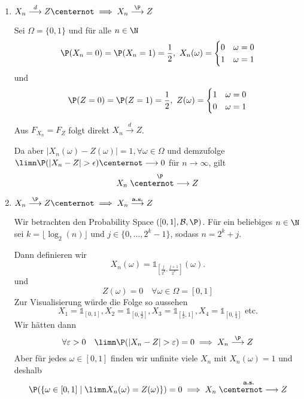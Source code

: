 \begin{enumerate}
    \item $X_n \overset{d}{\longrightarrow} Z \centernot\implies X_n \overset{\P}{\longrightarrow} Z$
    
    Sei $\Omega = \{0, 1\}$ und für alle $n \in \N$
    $$\P(X_n = 0) = \P(X_n = 1) = \frac{1}{2}, \ X_n(\omega) = \begin{cases}
        0 & \omega = 0\\
        1 & \omega = 1
    \end{cases} 
    $$
    und $$\P(Z = 0) = \P(Z = 1) = \frac{1}{2}, \ Z(\omega) = \begin{cases}
        1 & \omega = 0\\
        0 & \omega = 1
    \end{cases} $$

    Aus $F_{X_n} = F_Z$ folgt direkt $X_n \overset{d}{\longrightarrow} Z$.
    
    Da aber $|X_n(\omega) - Z(\omega)| = 1, \forall \omega \in \Omega$ und demzufolge\\ 
    $\limn \P(|X_n - Z| > \epsilon) \centernot\longrightarrow 0$ für $n \to \infty$, gilt  
    $$X_n \overset{\P}{\centernot\longrightarrow} Z$$
    \item $X_n \overset{\P}{\longrightarrow} Z \centernot\implies X_n \overset{\textbf{a.s.}}{\longrightarrow} Z$
    
    Wir betrachten den Probability Space $([0,1], \mathcal{B}, \P)$.
    Für ein beliebiges $n \in \N$ sei $k = \lfloor\log_2(n)\rfloor$ und $j \in \{0, \ldots, 2^k-1\}$, sodass $n = 2^k + j$.
    
    Dann definieren wir 
    $$X_n(\omega) = \mathds{1}_{\left[\frac{j}{2^k}, \frac{j+1}{2^k}\right]}(\omega).$$
    und
    $$Z(\omega) = 0 \quad \forall \omega \in \Omega = [0,1]$$
    Zur Visualisierung würde die Folge so aussehen
    $$X_1 = \mathds{1}_{[0,1]}, X_2 = \mathds{1}_{\left[0,\frac{1}{2}\right]}, X_3 = \mathds{1}_{\left[\frac{1}{2}, 1\right]}, X_4 = \mathds{1}_{\left[0,\frac{1}{4}\right]} \text{ etc.}$$
    Wir hätten dann
    $$\forall \varepsilon > 0 \quad \limn \P(|X_n - Z| > \varepsilon) = 0 \implies X_n \overset{\P}{\longrightarrow} Z$$
    Aber für jedes $\omega \in [0,1]$ finden wir unfinite viele $X_n$ mit $X_n(\omega) = 1$ und deshalb
    $$\P(\{\omega \in [0,1] \mid \limn X_n(\omega) = Z(\omega)\}) = 0 \implies X_n \overset{\textbf{a.s.}}{\centernot\longrightarrow} Z$$
\end{enumerate}
